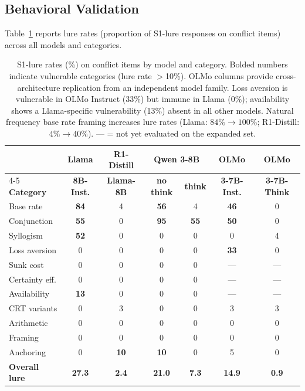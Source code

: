 \documentclass[accepted]{article}
\begin{document}
\subsection{Behavioral Validation}
\label{sec:results_behavioral}

Table~\ref{tab:behavioral} reports lure rates (proportion of S1-lure
responses on conflict items) across all models and categories.

\begin{table}[t]
\centering
\caption{S1-lure rates (\%) on conflict items by model and category.
  Bolded numbers indicate vulnerable categories (lure rate $>$10\%).
  OLMo columns provide cross-architecture replication from an
  independent model family.  Loss aversion is vulnerable in OLMo
  Instruct (33\%) but immune in Llama (0\%); availability shows a
  Llama-specific vulnerability (13\%) absent in all other models.
  Natural frequency base rate framing increases lure rates
  (Llama: $84\% \to 100\%$; R1-Distill: $4\% \to 40\%$).
  --- = not yet evaluated on the expanded set.}
\label{tab:behavioral}
\vspace{4pt}
\small
\begin{tabular}{lcccccc}
\toprule
& \textbf{Llama} & \textbf{R1-Distill} & \multicolumn{2}{c}{\textbf{Qwen 3-8B}} & \textbf{OLMo} & \textbf{OLMo} \\
\cmidrule(lr){4-5}
\textbf{Category} & \textbf{8B-Inst.} & \textbf{Llama-8B} & \textbf{no think} & \textbf{think} & \textbf{3-7B-Inst.} & \textbf{3-7B-Think} \\
\midrule
Base rate      & \textbf{84} & 4   & \textbf{56} & 4   & \textbf{46} & 0 \\
Conjunction    & \textbf{55} & 0   & \textbf{95} & \textbf{55} & \textbf{50} & 0 \\
Syllogism      & \textbf{52} & 0   & 0   & 0   & 0   & 4 \\
Loss aversion  & 0   & 0   & 0   & 0   & \textbf{33} & 0 \\
Sunk cost      & 0   & 0   & 0   & 0   & ---  & --- \\
Certainty eff. & 0   & 0   & 0   & 0   & ---  & --- \\
Availability   & \textbf{13} & 0   & 0   & 0   & ---  & --- \\
\midrule
CRT variants   & 0   & 3   & 0   & 0   & 3   & 3 \\
Arithmetic     & 0   & 0   & 0   & 0   & 0   & 0 \\
Framing        & 0   & 0   & 0   & 0   & 0   & 0 \\
Anchoring      & 0   & \textbf{10} & \textbf{10} & 0 & 5 & 0 \\
\midrule
\textbf{Overall lure} & \textbf{27.3} & \textbf{2.4} & \textbf{21.0} & \textbf{7.3} & \textbf{14.9} & \textbf{0.9} \\
\bottomrule
\end{tabular}
\end{table}
\end{document}
